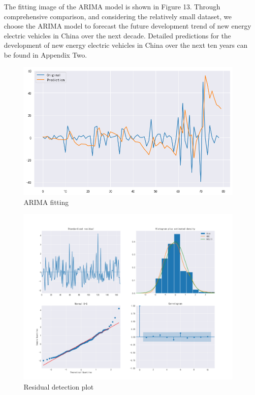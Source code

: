 \documentclass{apmcmthesis}
\begin{document}
The fitting image of the ARIMA model is shown in Figure 13. Through comprehensive comparison, and considering the relatively small dataset, we choose the ARIMA model to forecast the future development trend of new energy electric vehicles in China over the next decade. Detailed predictions for the development of new energy electric vehicles in China over the next ten years can be found in Appendix Two.
\begin{figure}[htbp]
    \centering
    \includegraphics[scale=0.5]{figures/Figure/问题二/ARIMA fitting.png}
    \caption{ARIMA fitting}
\end{figure}

\begin{figure}[htbp]
    \centering
    \includegraphics[scale=0.5]{figures/Figure/1234.png}
    \caption{Residual detection plot}
\end{figure}
\end{document}
